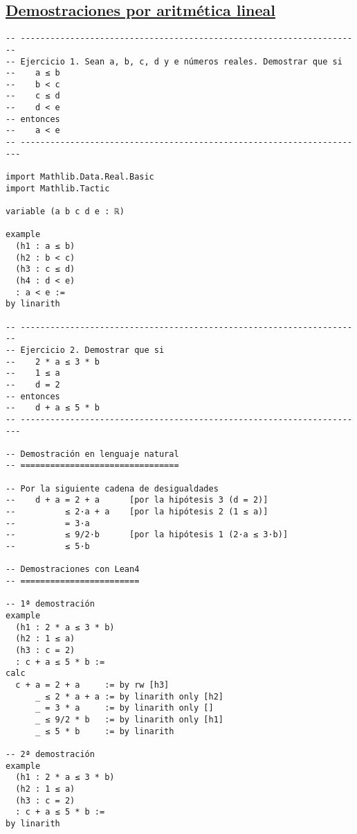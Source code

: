 \subsection{\href{./src/Basicos/Demostraciones\_por\_aritmetica\_lineal.lean}{Demostraciones por aritmética lineal}}
\label{sec:orgf9d5e6d}
\begin{verbatim}
-- ---------------------------------------------------------------------
-- Ejercicio 1. Sean a, b, c, d y e números reales. Demostrar que si
--    a ≤ b
--    b < c
--    c ≤ d
--    d < e
-- entonces
--    a < e
-- ----------------------------------------------------------------------

import Mathlib.Data.Real.Basic
import Mathlib.Tactic

variable (a b c d e : ℝ)

example
  (h1 : a ≤ b)
  (h2 : b < c)
  (h3 : c ≤ d)
  (h4 : d < e)
  : a < e :=
by linarith

-- ---------------------------------------------------------------------
-- Ejercicio 2. Demostrar que si
--    2 * a ≤ 3 * b
--    1 ≤ a
--    d = 2
-- entonces
--    d + a ≤ 5 * b
-- ----------------------------------------------------------------------

-- Demostración en lenguaje natural
-- ================================

-- Por la siguiente cadena de desigualdades
--    d + a = 2 + a      [por la hipótesis 3 (d = 2)]
--          ≤ 2·a + a    [por la hipótesis 2 (1 ≤ a)]
--          = 3·a
--          ≤ 9/2·b      [por la hipótesis 1 (2·a ≤ 3·b)]
--          ≤ 5·b

-- Demostraciones con Lean4
-- ========================

-- 1ª demostración
example
  (h1 : 2 * a ≤ 3 * b)
  (h2 : 1 ≤ a)
  (h3 : c = 2)
  : c + a ≤ 5 * b :=
calc
  c + a = 2 + a     := by rw [h3]
      _ ≤ 2 * a + a := by linarith only [h2]
      _ = 3 * a     := by linarith only []
      _ ≤ 9/2 * b   := by linarith only [h1]
      _ ≤ 5 * b     := by linarith

-- 2ª demostración
example
  (h1 : 2 * a ≤ 3 * b)
  (h2 : 1 ≤ a)
  (h3 : c = 2)
  : c + a ≤ 5 * b :=
by linarith
\end{verbatim}

